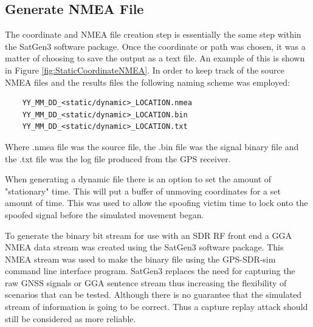 \subsection{Generate NMEA File} \label{subsec:NMEAFile}
The coordinate and NMEA file creation step is essentially the same step within the SatGen3 software package. Once the coordinate or path was chosen, it was a matter of
choosing to save the output as a text file. An example of this is shown in Figure \ref{fig:StaticCoordinateNMEA}. In order to keep track of the source NMEA files and the
results files the following naming scheme was employed:

\begin{verbatim}
    YY_MM_DD_<static/dynamic>_LOCATION.nmea
    YY_MM_DD_<static/dynamic>_LOCATION.bin
    YY_MM_DD_<static/dynamic>_LOCATION.txt
\end{verbatim}

Where .nmea file was the source file, the .bin file was the signal binary file and the .txt file was the log file produced from the GPS receiver.

When generating a dynamic file there is an option to set the amount of "stationary" time. This will put a buffer of unmoving coordinates for a set amount of time. This
was used to allow the spoofing victim time to lock onto the spoofed signal before the simulated movement began.

To generate the binary bit stream for use with an SDR RF front end a GGA NMEA data stream was created using the SatGen3 software package. This NMEA stream was used to make
the binary file using the GPS-SDR-sim command line interface program. SatGen3 replaces the need for capturing the raw GNSS signals or GGA sentence stream thus increasing
the flexibility of scenarios that can be tested. Although there is no guarantee that the simulated stream of information is going to be correct. Thus a capture replay
attack should still be considered as more reliable.

